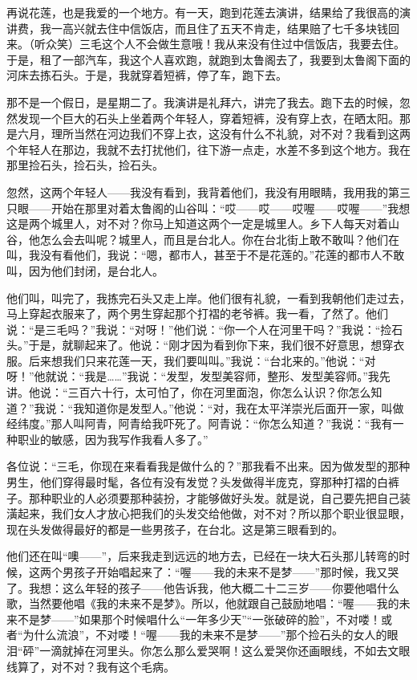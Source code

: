 \par 再说花莲，也是我爱的一个地方。有一天，跑到花莲去演讲，结果给了我很高的演讲费，我一高兴就去住中信饭店，而且住了五天不肯走，结果赔了七千多块钱回来。（听众笑）三毛这个人不会做生意哦！我从来没有住过中信饭店，我要去住。于是，租了一部汽车，我这个人喜欢跑，就跑到太鲁阁去了，我要到太鲁阁下面的河床去拣石头。于是，我就穿着短裤，停了车，跑下去。
\par 那不是一个假日，是星期二了。我演讲是礼拜六，讲完了我去。跑下去的时候，忽然发现一个巨大的石头上坐着两个年轻人，穿着短裤，没有穿上衣，在晒太阳。那是六月，理所当然在河边我们不穿上衣，这没有什么不礼貌，对不对？我看到这两个年轻人在那边，我就不去打扰他们，往下游一点走，水差不多到这个地方。我在那里捡石头，捡石头，捡石头。
\par 忽然，这两个年轻人——我没有看到，我背着他们，我没有用眼睛，我用我的第三只眼——开始在那里对着太鲁阁的山谷叫：“哎——哎——哎喔——哎喔——”我想这是两个城里人，对不对？你马上知道这两个一定是城里人。乡下人每天对着山谷，他怎么会去叫呢？城里人，而且是台北人。你在台北街上敢不敢叫？他们在叫，我没有看他们，我说：“嗯，都市人，甚至于不是花莲的。”花莲的都市人不敢叫，因为他们封闭，是台北人。
\par 他们叫，叫完了，我拣完石头又走上岸。他们很有礼貌，一看到我朝他们走过去，马上穿起衣服来了，两个男生穿起那个打褶的老爷裤。我一看，了然了。他们说：“是三毛吗？”我说：“对呀！”他们说：“你一个人在河里干吗？”我说：“捡石头。”于是，就聊起来了。他说：“刚才因为看到你下来，我们很不好意思，想穿衣服。后来想我们只来花莲一天，我们要叫叫。”我说：“台北来的。”他说：“对呀！”他就说：“我是……”我说：“发型，发型美容师，整形、发型美容师。”我先讲。他说：“三百六十行，太可怕了，你在河里面泡，你怎么认识？你怎么知道？”我说：“我知道你是发型人。”他说：“对，我在太平洋崇光后面开一家，叫做经纬度。”那人叫阿青，阿青给我吓死了。阿青说：“你怎么知道？”我说：“我有一种职业的敏感，因为我写作我看人多了。”
\par 各位说：“三毛，你现在来看看我是做什么的？”那我看不出来。因为做发型的那种男生，他们穿得最时髦，各位有没有发觉？头发做得半庞克，穿那种打褶的白裤子。那种职业的人必须要那种装扮，才能够做好头发。就是说，自己要先把自己装潢起来，我们女人才放心把我们的头发交给他做，对不对？所以那个职业很显眼，现在头发做得最好的都是一些男孩子，在台北。这是第三眼看到的。
\par 他们还在叫“噢——”，后来我走到远远的地方去，已经在一块大石头那儿转弯的时候，这两个男孩子开始唱起来了：“喔——我的未来不是梦——”那时候，我又哭了。我想：这么年轻的孩子——他告诉我，他大概二十二三岁——你要他唱什么歌，当然要他唱《我的未来不是梦》。所以，他就跟自己鼓励地唱：“喔——我的未来不是梦——”如果那个时候唱什么“一年多少天”“一张破碎的脸”，不对喽！或者“为什么流浪”，不对喽！“喔——我的未来不是梦——”那个捡石头的女人的眼泪“砰”一滴就掉在河里头。你怎么那么爱哭啊！这么爱哭你还画眼线，不如去文眼线算了，对不对？我有这个毛病。
